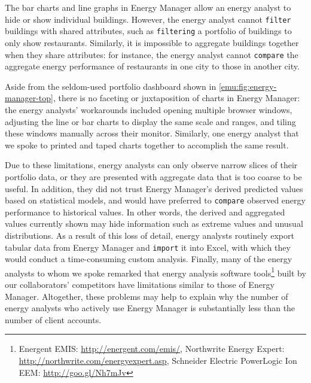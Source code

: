  The bar charts and line graphs in Energy Manager allow an energy analyst to hide or show individual buildings.
However, the energy analyst cannot {\tt filter}  buildings with shared attributes, such as {\tt filtering} a portfolio of buildings to only show restaurants.
Similarly, it is impossible to aggregate buildings together when they share attributes: for instance, the energy analyst cannot {\tt compare} the aggregate energy performance of restaurants in one city to those in another city.

 Aside from the seldom-used portfolio dashboard shown in \autoref{emu:fig:energy-manager-top}, there is no faceting or juxtaposition of charts in Energy Manager: the energy analysts' workarounds included opening multiple browser windows, adjusting the line or bar charts to display the same scale and ranges, and tiling these windows manually across their monitor. 
Similarly, one energy analyst that we spoke to printed and taped charts together to accomplish the same result.

 Due to these limitations, energy analysts can only observe narrow slices of their portfolio data, or they are presented with aggregate data that is too coarse to be useful.
In addition, they did not trust Energy Manager's derived predicted values based on statistical models, and would have preferred to {\tt compare} observed energy performance to historical values.
In other words, the derived and aggregated values currently shown may hide information such as extreme values and unusual distributions.
As a result of this loss of detail, energy analysts routinely export tabular data from Energy Manager and {\tt import} it into Excel, with which they would conduct a time-consuming custom analysis.
Finally, many of the energy analysts to whom we spoke remarked that energy analysis software tools\footnote{\eg Energent EMIS: \url{http://energent.com/emis/}, Northwrite Energy Expert: \url{http://northwrite.com/energyexpert.asp}, Schneider Electric PowerLogic Ion EEM: \url{http://goo.gl/Nh7mJv}} built by our collaborators' competitors have limitations similar to those of Energy Manager.
Altogether, these problems may help to explain why the number of energy analysts who actively use Energy Manager is substantially less than the number of client accounts.

